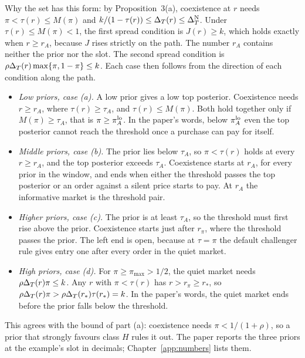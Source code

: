 Why the set has this form: by Proposition~3(a), coexistence at \(r\) needs \(\pi<\tau(r)\le M(\pi)\) and
\(k/(1-\tau(r))\le\Delta_T(r)\le\Delta_T^{\rm N}\). Under \(\tau(r)\le M(\pi)<1\), the first spread condition is \(J(r)\ge k\), which
holds exactly when \(r\ge r_A\), because \(J\) rises strictly on the path. The number \(r_A\) contains neither the prior
nor the slot. The second spread condition is \(\rho\Delta_T(r)\max\{\pi,1-\pi\}\le k\). Each case then follows from the
direction of each condition along the path.
\begin{itemize}
\item \emph{Low priors, case (a).} A low prior gives a low top posterior. Coexistence needs \(r\ge r_A\), where
\(\tau(r)\ge\tau_A\), and \(\tau(r)\le M(\pi)\). Both hold together only if \(M(\pi)\ge\tau_A\), that is
\(\pi\ge\pi_A^{\rm lo}\). In the paper's words, below \(\pi_A^{\rm lo}\) even the top posterior cannot reach the
threshold once a purchase can pay for itself.
\item \emph{Middle priors, case (b).} The prior lies below \(\tau_A\), so \(\pi<\tau(r)\) holds at every \(r\ge r_A\),
and the top posterior exceeds \(\tau_A\). Coexistence starts at \(r_A\), for every prior in the window, and ends when
either the threshold passes the top posterior or an order against a silent price starts to pay. At \(r_A\) the
informative market is the threshold pair.
\item \emph{Higher priors, case (c).} The prior is at least \(\tau_A\), so the threshold must first rise above the
prior. Coexistence starts just after \(r_\pi\), where the threshold passes the prior. The left end is open, because at
\(\tau=\pi\) the default challenger rule gives entry one after every order in the quiet market.
\item \emph{High priors, case (d).} For \(\pi\ge\pi_{\max}>1/2\), the quiet market needs \(\rho\Delta_T(r)\pi\le k\). Any
\(r\) with \(\pi<\tau(r)\) has \(r>r_\pi\ge r_*\), so \(\rho\Delta_T(r)\pi>\rho\Delta_T(r_*)\tau(r_*)=k\). In the paper's words,
the quiet market ends before the prior falls below the threshold.
\end{itemize}
This agrees with the bound of part (a): coexistence needs \(\pi<1/(1+\rho)\), so a prior that strongly favours class
\(H\) rules it out. The paper reports the three priors at the example's slot in decimals; Chapter~\ref{app:numbers}
lists them.

